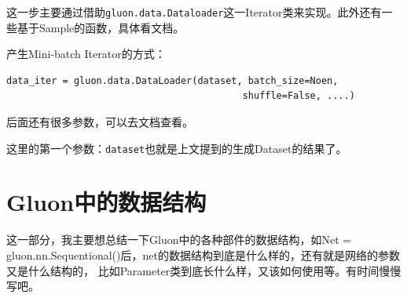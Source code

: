 这一步主要通过借助\verb|gluon.data.Dataloader|这一Iterator类来实现。此外还有一些基于Sample的函数，具体看文档。

产生Mini-batch Iterator的方式：

\begin{verbatim}
data_iter = gluon.data.DataLoader(dataset, batch_size=Noen,  
                                          shuffle=False, ....)
\end{verbatim}

后面还有很多参数，可以去文档查看。

这里的第一个参数：\verb|dataset|也就是上文提到的生成Dataset的结果了。

\section{Gluon中的数据结构}

这一部分，我主要想总结一下Gluon中的各种部件的数据结构，如Net = gluon.nn.Sequentional()后，net的数据结构到底是什么样的，还有就是网络的参数又是什么结构的， 比如Parameter类到底长什么样，又该如何使用等。有时间慢慢写吧。









